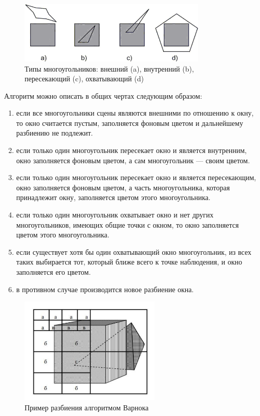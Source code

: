 \begin{figure}[h] 
	\centering
	\includegraphics[width=0.8\textwidth]{images/varnok-models.png}
	\caption{Типы многоугольников: внешний (a), внутренний (b), пересекающий (c), охватывающий (d)} 
	\label{fig:varnok-models} 
\end{figure}

Алгоритм можно описать в общих чертах следующим образом:
\begin{enumerate}
	\item если все многоугольники сцены являются внешними по отношению к окну, то окно считается пустым, заполняется фоновым цветом и дальнейшему разбиению не подлежит.
	\item если только один многоугольник пересекает окно и является внутренним, окно заполняется фоновым цветом, а сам многоугольник — своим цветом.
	\item если только один многоугольник пересекает окно и является пересекающим, окно заполняется фоновым цветом, а часть многоугольника, которая принадлежит окну, заполняется цветом этого многоугольника.
	\item если только один многоугольник охватывает окно и нет других многоугольников, имеющих общие точки с окном, то окно заполняется цветом этого многоугольника.
	\item если существует хотя бы один охватывающий окно многоугольник, из всех таких выбирается тот, который ближе всего к точке наблюдения, и окно заполняется его цветом.
	\item в противном случае производится новое разбиение окна.
\end{enumerate}

\begin{figure}[h] 
	\centering
	\includegraphics[width=0.6\textwidth]{images/varnok.png}
	\caption{Пример разбиения алгоритмом Варнока} 
	\label{fig:varnok} 
\end{figure}


